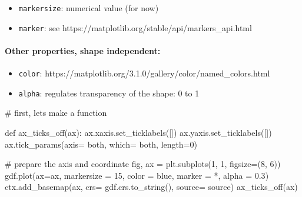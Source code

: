 \documentclass[
  letterpaper,
  DIV=11,
  numbers=noendperiod]{scrreprt}
\let\oldparagraph\paragraph
\renewcommand{\paragraph}[1]{\oldparagraph{#1}\mbox{}}
\newenvironment{Shaded}{\begin{snugshade}}{\end{snugshade}}
\newcommand{\CommentTok}[1]{\textcolor[rgb]{0.37,0.37,0.37}{#1}}
\newcommand{\DecValTok}[1]{\textcolor[rgb]{0.68,0.00,0.00}{#1}}
\newcommand{\FloatTok}[1]{\textcolor[rgb]{0.68,0.00,0.00}{#1}}
\newcommand{\KeywordTok}[1]{\textcolor[rgb]{0.00,0.23,0.31}{#1}}
\newcommand{\NormalTok}[1]{\textcolor[rgb]{0.00,0.23,0.31}{#1}}
\newcommand{\OperatorTok}[1]{\textcolor[rgb]{0.37,0.37,0.37}{#1}}
\newcommand{\StringTok}[1]{\textcolor[rgb]{0.13,0.47,0.30}{#1}}
\providecommand{\tightlist}{%
  \setlength{\itemsep}{0pt}\setlength{\parskip}{0pt}}\usepackage{longtable,booktabs,array}
\begin{document}
\begin{itemize}
\tightlist
\item
  \texttt{markersize}: numerical value (for now)
\item
  \texttt{marker}: see
  https://matplotlib.org/stable/api/markers\_api.html
\end{itemize}

\paragraph{Other properties, shape
independent:}\label{other-properties-shape-independent}

\begin{itemize}
\tightlist
\item
  \texttt{color}:
  https://matplotlib.org/3.1.0/gallery/color/named\_colors.html
\item
  \texttt{alpha}: regulates transparency of the shape: 0 to 1
\end{itemize}

\begin{Shaded}
\begin{Highlighting}[]
\CommentTok{\# first, let\textquotesingle{}s make a function}

\KeywordTok{def}\NormalTok{ ax\_ticks\_off(ax):}
\NormalTok{    ax.xaxis.set\_ticklabels([])}
\NormalTok{    ax.yaxis.set\_ticklabels([])}
\NormalTok{    ax.tick\_params(axis}\OperatorTok{=} \StringTok{\textquotesingle{}both\textquotesingle{}}\NormalTok{, which}\OperatorTok{=} \StringTok{\textquotesingle{}both\textquotesingle{}}\NormalTok{, length}\OperatorTok{=}\DecValTok{0}\NormalTok{)}
\end{Highlighting}
\end{Shaded}

\begin{Shaded}
\begin{Highlighting}[]
\CommentTok{\# prepare the axis and coordinate}
\NormalTok{fig, ax }\OperatorTok{=}\NormalTok{ plt.subplots(}\DecValTok{1}\NormalTok{, }\DecValTok{1}\NormalTok{, figsize}\OperatorTok{=}\NormalTok{(}\DecValTok{8}\NormalTok{, }\DecValTok{6}\NormalTok{))}
\NormalTok{gdf.plot(ax}\OperatorTok{=}\NormalTok{ax, markersize }\OperatorTok{=} \DecValTok{15}\NormalTok{, color }\OperatorTok{=} \StringTok{\textquotesingle{}blue\textquotesingle{}}\NormalTok{, marker }\OperatorTok{=} \StringTok{\textquotesingle{}*\textquotesingle{}}\NormalTok{, alpha }\OperatorTok{=} \FloatTok{0.3}\NormalTok{)}
\NormalTok{ctx.add\_basemap(ax, crs}\OperatorTok{=}\NormalTok{ gdf.crs.to\_string(), source}\OperatorTok{=}\NormalTok{ source)}
\NormalTok{ax\_ticks\_off(ax)}
\end{Highlighting}
\end{Shaded}
\end{document}
